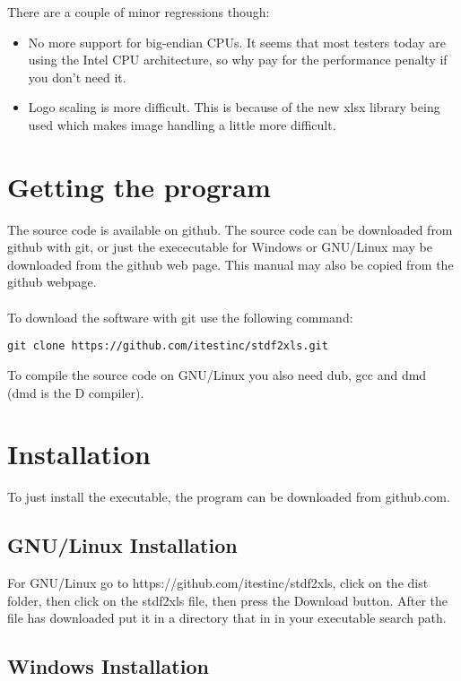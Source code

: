 \documentclass[letterpaper]{article}
\begin{document}
There are a couple of minor regressions though:
\begin{itemize}
\item No more support for big-endian CPUs.
It seems that most testers today are using the Intel CPU architecture,
so why pay for the performance penalty if you don't need it.
\item Logo scaling is more difficult.  This is because of
the new xlsx library being used which makes image handling
a little more difficult.
\end{itemize}

\section{\bf Getting the program}

The source code is available on github. The source code can be downloaded
from github with git, or just the exececutable for Windows or GNU/Linux
may be downloaded from the github web page.  This manual may also be copied
from the github webpage.\\
\\
To download the software with git use the following command:
\begin{verbatim}
git clone https://github.com/itestinc/stdf2xls.git
\end{verbatim}

\noindent To compile the source code on GNU/Linux you also need dub, gcc and dmd (dmd is the D compiler).

\section{\bf Installation}

To just install the executable, the program can be downloaded from github.com.

\subsection{\bf GNU/Linux Installation}

For GNU/Linux go to https://github.com/itestinc/stdf2xls, click on the dist folder, then
click on the stdf2xls file, then press the Download button.  After the file has downloaded
put it in a directory that in in your executable search path.

\subsection{\bf Windows Installation}
\end{document}
